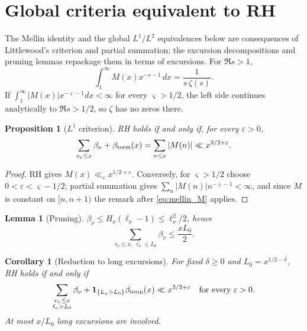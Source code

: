 \documentclass[11pt]{amsart}
\numberwithin{equation}{section}
\theoremstyle{plain}
\newtheorem{proposition}[theorem]{Proposition}
\newtheorem{lemma}[theorem]{Lemma}
\newtheorem{corollary}[theorem]{Corollary}
\theoremstyle{definition}
\theoremstyle{remark}
\newcommand{\eps}{\varepsilon}
\begin{document}
\section{Global criteria equivalent to RH}
\label{sec:criteria}

The Mellin identity and the global $L^1/L^2$ equivalences below are
consequences of Littlewood's criterion and partial summation; the excursion
decompositions and pruning lemmas repackage them in terms of excursions.
For $\Re s>1$,
\begin{equation}
\label{eq:mellin_M}
  \int_1^\infty M(x)x^{-s-1}\,dx=\frac{1}{s\,\zeta(s)} .
\end{equation}
If $\int_1^\infty|M(x)|x^{-\varsigma-1}dx<\infty$ for every $\varsigma>1/2$, the
left side continues analytically to $\Re s>1/2$, so $\zeta$ has no zeros
there.

\begin{proposition}[$L^1$ criterion]
\label{prop:L1}
RH holds if and only if, for every $\eps>0$,
\begin{equation}
\label{eq:L1_criterion}
  \sum_{v_\nu\le x}\beta_\nu+\beta_{\rm term}(x)=\sum_{n\le x}|M(n)|
  \ll x^{3/2+\eps}.
\end{equation}
\end{proposition}

\begin{proof}
RH gives $M(x)\ll_\eps x^{1/2+\eps}$. Conversely, for $\varsigma>1/2$ choose
$0<\eps<\varsigma-1/2$; partial summation gives
$\sum_n|M(n)|n^{-\varsigma-1}<\infty$, and since $M$ is constant on $[n,n+1)$
the remark after \eqref{eq:mellin_M} applies.
\end{proof}

\begin{lemma}[Pruning]
\label{lem:pruning}
$\beta_\nu\le H_\nu(\ell_\nu-1)\le\ell_\nu^2/2$, hence
\begin{equation}
\label{eq:pruning}
  \sum_{v_\nu\le x,\ \ell_\nu\le L_0}\beta_\nu\le\frac{xL_0}{2}.
\end{equation}
\end{lemma}

\begin{corollary}[Reduction to long excursions]
\label{cor:long}
For fixed $\delta\ge0$ and $L_0=x^{1/2-\delta}$, RH holds if and only if
\begin{equation}
\label{eq:long_reduction}
  \sum_{\substack{v_\nu\le x\\ \ell_\nu>L_0}}\beta_\nu
  +\mathbf 1_{\{L_x>L_0\}}\beta_{\rm term}(x)\ll x^{3/2+\eps}
  \quad\text{for every }\eps>0.
\end{equation}
At most $x/L_0$ long excursions are involved.
\end{corollary}
\end{document}
